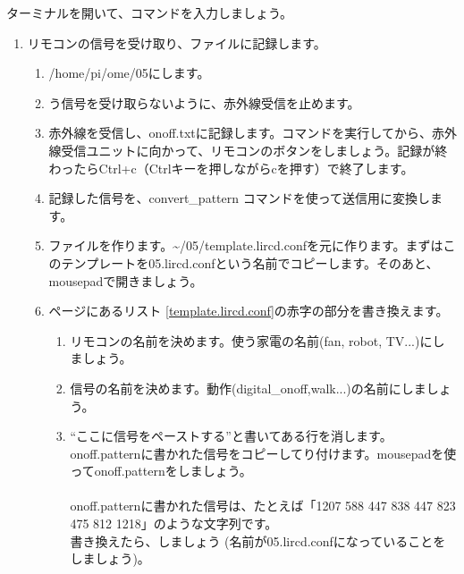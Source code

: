 \begin{tcolorbox}[title=\useOmetoi]
ターミナルを開いて、コマンドを入力しましょう。
\begin{enumerate}
\item リモコンの信号を受け取り、ファイルに記録します。
 \begin{enumerate}[1]
  \item /home/pi/ome/05にします。\\ 
  \item {}う信号を受け取らないように、赤外線受信を止めます。 \\ 
  \item 赤外線を受信し、onoff.txtに記録します。コマンドを実行してから、赤外線受信ユニットに向かって、リモコンのボタンをしましょう。記録が終わったらCtrl+c（Ctrlキーを押しながらcを押す）で終了します。\\ 
  \item 記録した信号を、convert\_pattern コマンドを使って送信用に変換します。\\ 
  \item {}ファイルを作ります。\textasciitilde /05/template.lircd.confを元に作ります。まずはこのテンプレートを05.lircd.confという名前でコピーします。そのあと、mousepadで開きましょう。\\ 
  \item \pageref{template.lircd.conf}ページにあるリスト \ref{template.lircd.conf}の赤字の部分を書き換えます。
  \begin{enumerate}[(1)]
    \item リモコンの名前を決めます。使う家電の名前(fan, robot, TV...)にしましょう。
    \item 信号の名前を決めます。動作(digital\_onoff,walk...)の名前にしましょう。
    \item “ここに信号をペーストする”と書いてある行を消します。onoff.patternに書かれた信号をコピーしてり付けます。mousepadを使ってonoff.patternをしましょう。\\ 
\\onoff.patternに書かれた信号は、たとえば「1207 588 447 838 447 823 475 812 1218」のような文字列です。\\書き換えたら、しましょう (名前が05.lircd.confになっていることをしましょう)。

\end{enumerate}
\end{enumerate}
\end{enumerate}
\end{tcolorbox}
